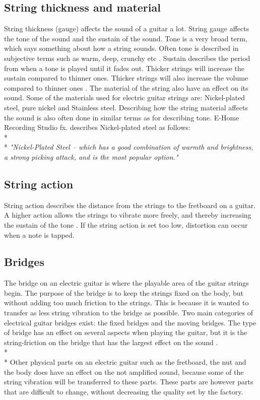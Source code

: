 \subsection{String thickness and material}
String thickness (gauge) affects the sound of a guitar a lot. String gauge affects the tone of the sound and the sustain of the sound. Tone is a very broad term, which says something about how a string sounds. Often tone is described in subjective terms such as warm, deep, crunchy etc \cite{premierguitar}. Sustain describes the period from when a tone is played until it fades out. Thicker strings will increase the sustain compared to thinner ones. Thicker strings will also increase the volume compared to thinner ones \cite{Helsinki}.
The material of the string also have an effect on its sound. Some of the materials used for electric guitar strings are: Nickel-plated steel, pure nickel and Stainless steel. Describing how the string material affects the sound is also often done in similar terms as for describing tone. E-Home Recording Studio fx. describes Nickel-plated steel as follows:
\\*
\\*
\textit{"Nickel-Plated Steel – which has a good combination of warmth and brightness, a strong picking attack, and is the most popular option."}\cite{E-Home}

\subsection{String action}
String action describes the distance from the strings to the fretboard on a guitar. A higher action allows the strings to vibrate more freely, and thereby increasing the sustain of the tone \cite{sweetwater}. If the string action is set too low, distortion can occur when a note is tapped.  

\subsection{Bridges}
The bridge on an electric guitar is where the playable area of the guitar strings begin. The purpose of the bridge is to keep the strings fixed on the body, but without adding too much friction to the strings. This is because it is wanted to transfer as less string vibration to the bridge as possible. Two main categories of electrical guitar bridges exist: the fixed bridges and the moving bridges. The type of bridge has an effect on several aspects when playing the guitar, but it is the string-friction on the bridge that has the largest effect on the sound \cite{seymourduncan}.
\\*
\\*
Other physical parts on an electric guitar such as the fretboard, the nut and the body does have an effect on the not amplified sound, because some of the string vibration will be transferred to these parts. These parts are however parts that are difficult to change, without decreasing the quality set by the factory.   






